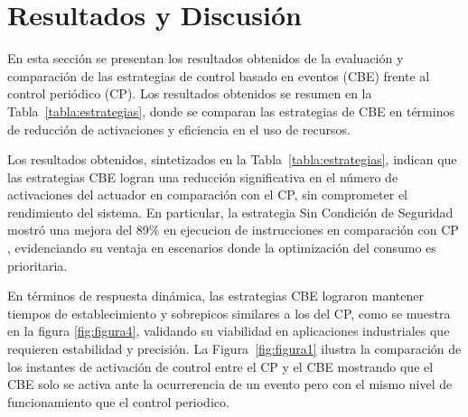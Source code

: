 \documentclass[conference]{IEEEtran}
\begin{document}
\begin{table}[h]
    \centering
    \caption{Comparación de Estrategias de Control Basado en Eventos}
    \label{tabla:estrategias}
\end{table}

\section{Resultados y Discusión}
En esta sección se presentan los resultados obtenidos de la evaluación y comparación de las estrategias de control basado en eventos (CBE) frente al control periódico (CP). Los resultados obtenidos se resumen en la Tabla~\ref{tabla:estrategias}, donde se comparan las estrategias de CBE en términos de reducción de activaciones y eficiencia en el uso de recursos.


Los resultados obtenidos, sintetizados en la Tabla~\ref{tabla:estrategias}, indican que las estrategias CBE logran una reducción significativa en el número de activaciones del actuador en comparación con el CP, sin comprometer el rendimiento del sistema. En particular, la estrategia Sin Condición de Seguridad mostró una mejora del 89\% en ejecucion de instrucciones en comparación con CP , evidenciando su ventaja en escenarios donde la optimización del consumo es prioritaria.

En términos de respuesta dinámica, las estrategias CBE lograron mantener tiempos de establecimiento y sobrepicos similares a los del CP, como se muestra en la figura \ref{fig:figura4}, validando su viabilidad en aplicaciones industriales que requieren estabilidad y precisión. La Figura~\ref{fig:figura1} ilustra la comparación de los instantes de activación de control entre el CP y el CBE mostrando que el CBE solo se activa ante la ocurrerencia de un evento pero con el mismo nivel de funcionamiento que el control periodico.
\end{document}
